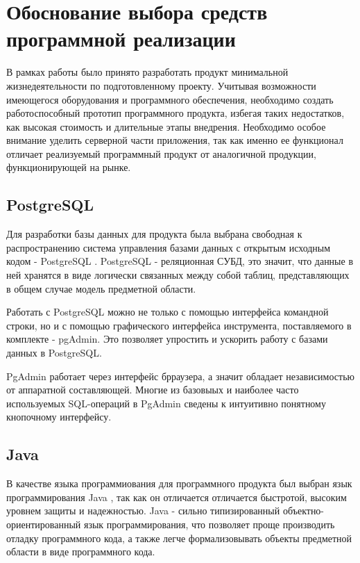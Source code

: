 \sectioncounter
\section{Обоснование выбора средств программной реализации}

В рамках работы было принято разработать продукт минимальной жизнедеятельности по подготовленному проекту. 
Учитывая возможности имеющегося оборудования и программного обеспечения, необходимо создать работоспособный прототип программного продукта, избегая таких недостатков, как высокая стоимость и длительные этапы внедрения.
Необходимо особое внимание уделить серверной части приложения, так как именно ее функционал отличает реализуемый программный продукт от аналогичной продукции, функционирующей на рынке.

\subsection{PostgreSQL}

Для разработки базы данных для продукта была выбрана свободная к распространению система управления базами данных с открытым исходным кодом - PostgreSQL \cite{postgresql-doc}.
PostgreSQL - реляционная СУБД, это значит, что данные в ней хранятся в виде логически связанных между собой таблиц, представляющих в общем случае модель предметной области.

Работать с PostgreSQL можно не только с помощью интерфейса командной строки, но и с помощью графического интерфейса инструмента, поставляемого в комплекте - pgAdmin. 
Это позволяет упростить и ускорить работу с базами данных в PostgreSQL.

PgAdmin работает через интерфейс брраузера, а значит обладает независимостью от аппаратной составляющей.
Многие из базовыых и наиболее часто используемых SQL-операций в PgAdmin сведены к интуитивно понятному кнопочному интерфейсу.

\subsection{Java}

В качестве языка программиования для программного продукта был выбран язык программирования Java \cite{java-doc}, так как он отличается отличается быстротой, высоким уровнем защиты и надежностью.
Java - сильно типизированный объектно-ориентированный язык программирования, что позволяет проще производить отладку программного кода, а также легче формализовывать объекты предметной области в виде программного кода.

